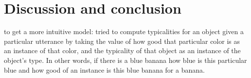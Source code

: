 \documentclass[10pt,letterpaper]{article}
\begin{document}



\section{\bf Discussion and conclusion}
to get a more intuitive model: tried to compute typicalities for an object given a particular utterance by taking the value of how good that particular color is as an instance of that color, and the typicality of that object as an instance of the object's type. In other words, if there is a blue banana how blue is this particular blue and how good of an instance is this blue banana for a banana.
\end{document}
